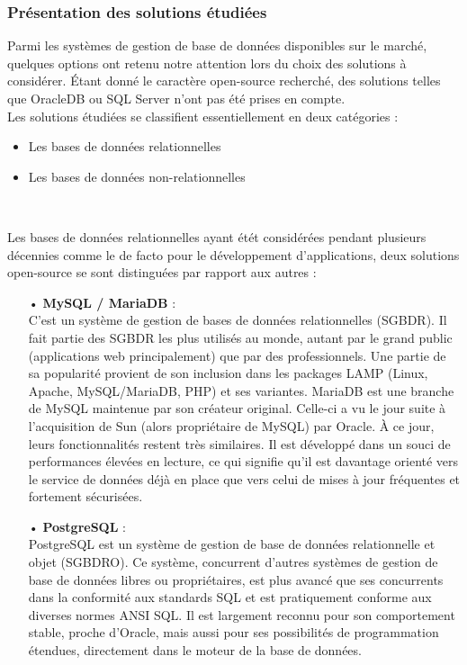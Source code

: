 \begin{spacing}{1.5}
\subsubsection{Présentation des solutions étudiées}%
Parmi les systèmes de gestion de base de données disponibles sur le marché, quelques options ont retenu notre attention lors du choix des solutions à considérer. Étant donné le caractère open-source recherché, des solutions telles que OracleDB ou SQL Server n’ont pas été prises en compte.\\
Les solutions étudiées se classifient essentiellement en deux catégories :
\begin{itemize}
    \item Les bases de données relationnelles
    \item Les bases de données non-relationnelles
\end{itemize}
\

Les bases de données relationnelles ayant étét considérées pendant plusieurs décennies comme le de facto pour le développement d’applications, deux solutions open-source se sont distinguées par rapport aux autres :
\begin{itemize}
    \item[•] \textbf{MySQL / MariaDB} :\\
C’est un système de gestion de bases de données relationnelles (SGBDR). Il fait partie des SGBDR les plus utilisés au monde, autant par le grand public (applications web principalement) que par des professionnels. Une partie de sa popularité provient de son inclusion dans les packages LAMP (Linux, Apache, MySQL/MariaDB, PHP) et ses variantes. MariaDB est une branche de MySQL maintenue par son créateur original. Celle-ci a vu le jour suite à l’acquisition de Sun (alors propriétaire de MySQL) par Oracle. À ce jour, leurs fonctionnalités restent très similaires. Il est développé dans un souci de performances élevées en lecture, ce qui signifie qu'il est davantage orienté vers le service de données déjà en place que vers celui de mises à jour fréquentes et fortement sécurisées.
    \item[•] \textbf{PostgreSQL} :\\
PostgreSQL est un système de gestion de base de données relationnelle et objet (SGBDRO). Ce système, concurrent d'autres systèmes de gestion de base de données libres ou propriétaires, est plus avancé que ses concurrents dans la conformité aux standards SQL et est pratiquement conforme aux diverses normes ANSI SQL. Il est largement reconnu pour son comportement stable, proche d’Oracle, mais aussi pour ses possibilités de programmation étendues, directement dans le moteur de la base de données.
\end{itemize}
\


\end{spacing}
